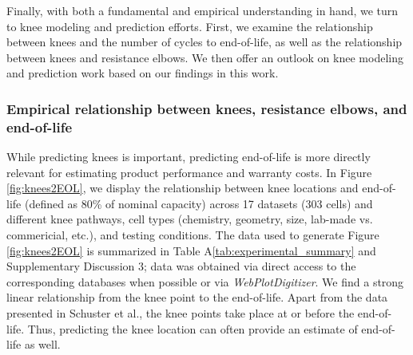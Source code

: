 \documentclass[journal=jpclcd,manuscript=article]{achemso}
\newcommand{\ssri}[1]{{
\fbox{
\parbox{0.8\textwidth}{  \fbox{$\triangleright$\textcolor{blue}{\textbf{Shashank}:}} 
#1
}}}}
\newcommand{\pbox}[1]{{
\fbox{
\parbox{0.8\textwidth}{  \fbox{$\triangleright$\textcolor{blue}{\textbf{Peter}:}} 
#1
}}}}
\begin{document}
Finally, with both a fundamental and empirical understanding in hand, we turn to knee modeling and prediction efforts.
First, we examine the relationship between knees and the number of cycles to end-of-life, as well as the relationship between knees and resistance elbows.
We then offer an outlook on knee modeling and prediction work based on our findings in this work.


\subsubsection{Empirical relationship between knees, resistance elbows, and end-of-life}

While predicting knees is important, predicting end-of-life is more directly relevant for estimating product performance and warranty costs. In Figure \ref{fig:knees2EOL}, we display the relationship between knee locations and end-of-life (defined as 80\% of nominal capacity) across 17 datasets (303 cells) and different knee pathways, cell types (chemistry, geometry, size, lab-made vs. commericial, etc.), and testing conditions. The data used to generate Figure \ref{fig:knees2EOL} is summarized in Table A\ref{tab:experimental_summary} and Supplementary Discussion 3; data was obtained via direct access to the corresponding databases when possible\cite{baumhofer_production_2014,diao_accelerated_2019,severson_data-driven_2019,willenberg_high-precision_2020,attia_closed-loop_2020} or via \textit{WebPlotDigitizer}\cite{dos_reis_lithium-ion_2021}.
We find a strong linear relationship from the knee point to the end-of-life. Apart from the data presented in Schuster et al.\cite{schuster_nonlinear_2015}, the knee points take place at or before the end-of-life.
Thus, predicting the knee location can often provide an estimate of end-of-life as well.
\end{document}
